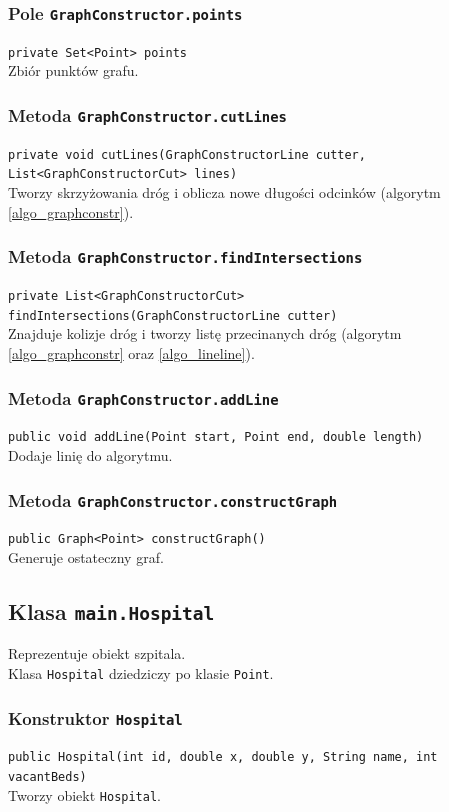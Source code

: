 \documentclass{article}
\begin{document}
\subsubsection{Pole \texttt{GraphConstructor.points}}
\texttt{private Set<Point> points} \\
Zbiór punktów grafu.

\subsubsection{Metoda \texttt{GraphConstructor.cutLines}}
\texttt{private void cutLines(GraphConstructorLine cutter, List<GraphConstructorCut> lines)} \\
Tworzy skrzyżowania dróg i oblicza nowe długości odcinków (algorytm \ref{algo_graphconstr}).

\subsubsection{Metoda \texttt{GraphConstructor.findIntersections}}
\texttt{private List<GraphConstructorCut> findIntersections(GraphConstructorLine cutter)} \\
Znajduje kolizje dróg i tworzy listę przecinanych dróg (algorytm \ref{algo_graphconstr} oraz \ref{algo_lineline}).

\subsubsection{Metoda \texttt{GraphConstructor.addLine}}
\texttt{public void addLine(Point start, Point end, double length)} \\
Dodaje linię do algorytmu.

\subsubsection{Metoda \texttt{GraphConstructor.constructGraph}}
\texttt{public Graph<Point> constructGraph()} \\
Generuje ostateczny graf.

\pagebreak
\subsection{Klasa \texttt{main.Hospital}}
Reprezentuje obiekt szpitala. \\
Klasa \texttt{Hospital} dziedziczy po klasie \texttt{Point}.

\subsubsection{Konstruktor \texttt{Hospital}}
\texttt{public Hospital(int id, double x, double y, String name, int vacantBeds)} \\
Tworzy obiekt \texttt{Hospital}.
\end{document}
